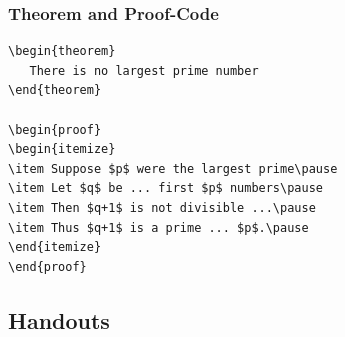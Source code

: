 \documentclass{beamer}
\newcommand{\blue}[1]{\usebeamercolor[fg]{blue}#1}
\begin{document}
\begin{frame}[fragile]
  \frametitle{Theorem and Proof-\blue{Code}}
\begin{verbatim}
\begin{theorem}
   There is no largest prime number 
\end{theorem}

\begin{proof}
\begin{itemize}
\item Suppose $p$ were the largest prime\pause
\item Let $q$ be ... first $p$ numbers\pause
\item Then $q+1$ is not divisible ...\pause
\item Thus $q+1$ is a prime ... $p$.\pause
\end{itemize}
\end{proof}
\end{verbatim}
\end{frame}



\subsection{Handouts}
\end{document}
